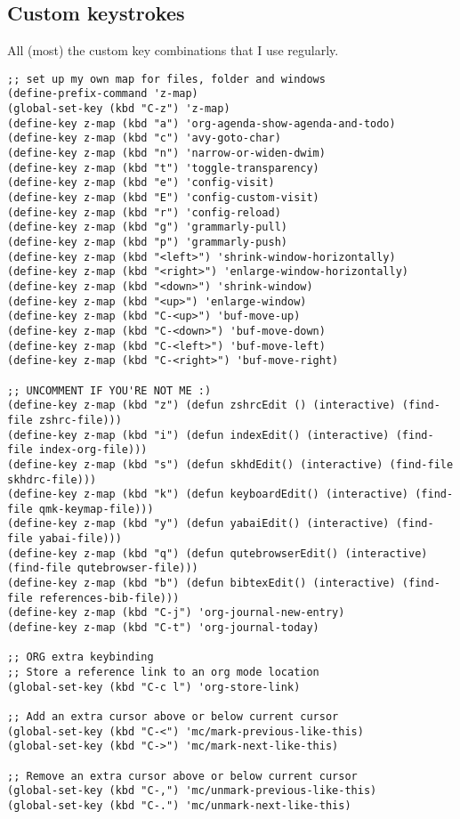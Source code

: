\documentclass[11pt]{article}
\begin{document}
\subsection{Custom keystrokes}
\label{sec:org25ccc0c}
All (most) the custom key combinations that I use regularly.
\begin{verbatim}
;; set up my own map for files, folder and windows
(define-prefix-command 'z-map)
(global-set-key (kbd "C-z") 'z-map)
(define-key z-map (kbd "a") 'org-agenda-show-agenda-and-todo)
(define-key z-map (kbd "c") 'avy-goto-char)
(define-key z-map (kbd "n") 'narrow-or-widen-dwim)
(define-key z-map (kbd "t") 'toggle-transparency)
(define-key z-map (kbd "e") 'config-visit)
(define-key z-map (kbd "E") 'config-custom-visit)
(define-key z-map (kbd "r") 'config-reload)
(define-key z-map (kbd "g") 'grammarly-pull)
(define-key z-map (kbd "p") 'grammarly-push)
(define-key z-map (kbd "<left>") 'shrink-window-horizontally)
(define-key z-map (kbd "<right>") 'enlarge-window-horizontally)
(define-key z-map (kbd "<down>") 'shrink-window)
(define-key z-map (kbd "<up>") 'enlarge-window)
(define-key z-map (kbd "C-<up>") 'buf-move-up)
(define-key z-map (kbd "C-<down>") 'buf-move-down)
(define-key z-map (kbd "C-<left>") 'buf-move-left)
(define-key z-map (kbd "C-<right>") 'buf-move-right)

;; UNCOMMENT IF YOU'RE NOT ME :)
(define-key z-map (kbd "z") (defun zshrcEdit () (interactive) (find-file zshrc-file)))
(define-key z-map (kbd "i") (defun indexEdit() (interactive) (find-file index-org-file)))
(define-key z-map (kbd "s") (defun skhdEdit() (interactive) (find-file skhdrc-file)))
(define-key z-map (kbd "k") (defun keyboardEdit() (interactive) (find-file qmk-keymap-file)))
(define-key z-map (kbd "y") (defun yabaiEdit() (interactive) (find-file yabai-file)))
(define-key z-map (kbd "q") (defun qutebrowserEdit() (interactive) (find-file qutebrowser-file)))
(define-key z-map (kbd "b") (defun bibtexEdit() (interactive) (find-file references-bib-file)))
(define-key z-map (kbd "C-j") 'org-journal-new-entry)
(define-key z-map (kbd "C-t") 'org-journal-today)

;; ORG extra keybinding
;; Store a reference link to an org mode location
(global-set-key (kbd "C-c l") 'org-store-link)

;; Add an extra cursor above or below current cursor
(global-set-key (kbd "C-<") 'mc/mark-previous-like-this)
(global-set-key (kbd "C->") 'mc/mark-next-like-this)

;; Remove an extra cursor above or below current cursor
(global-set-key (kbd "C-,") 'mc/unmark-previous-like-this)
(global-set-key (kbd "C-.") 'mc/unmark-next-like-this)


\end{verbatim}
\end{document}
